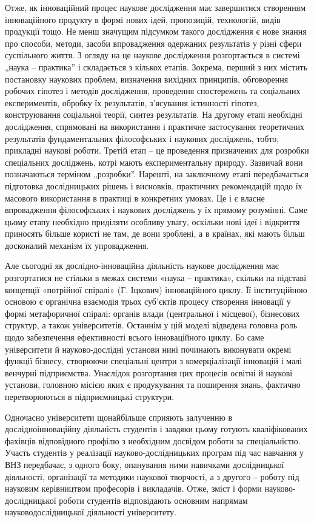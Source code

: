 Отже, як інноваційний процес наукове дослідження має завершитися
створенням інноваційного продукту в формі нових ідей, пропозицій,
технологій, видів продукції тощо. Не менш значущим підсумком такого
дослідження є нове знання про способи, методи, засоби впровадження
одержаних результатів у різні сфери суспільного життя. З огляду на це наукове
дослідження розгортається в системі „наука – практика” і складається з кількох
етапів. Зокрема, перший з них містить постановку наукових проблем,
визначення вихідних принципів, обговорення робочих гіпотез і методів
дослідження, проведення спостережень та соціальних експериментів, обробку
їх результатів, з’ясування істинності гіпотез, конструювання соціальної теорії,
синтез результатів. На другому етапі необхідні дослідження, спрямовані на
використання і практичне застосування теоретичних результатів
фундаментальних філософських і наукових досліджень, тобто, прикладні
наукові роботи. Третій етап – це проведення призначених для розробки
спеціальних досліджень, котрі мають експериментальну природу. Зазвичай вони
позначаються терміном „розробки”. Нарешті, на заключному етапі
передбачається підготовка дослідницьких рішень і висновків, практичних
рекомендацій щодо їх масового використання в практиці в конкретних умовах.
Це і є власне впровадження філософських і наукових досліджень у їх прямому
розумінні. Саме цьому етапу необхідно приділяти особливу увагу, оскільки нові
ідеї і відкриття приносять більше користі не там, де вони зроблені, а в країнах,
які мають більш досконалий механізм їх упровадження.

Але сьогодні як дослідно-інноваційна діяльність наукове дослідження має
розгортатися не стільки в межах системи «наука ‒ практика», скільки на
підставі концепції «потрійної спіралі» (Г. Іцкович) інноваційного циклу. Її
інституційною основою є органічна взаємодія трьох суб’єктів процесу
створення інновації у формі метафоричної спіралі: органів влади (центральної і
місцевої), бізнесових структур, а також університетів. Останнім у цій моделі
відведена головна роль щодо забезпечення ефективності всього інноваційного
циклу. Бо саме університети й науково-дослідні установи нині починають
виконувати окремі функції бізнесу, створюючи спеціальні центри з
комерціалізації інновацій і малі венчурні підприємства. Унаслідок розгортання
цих процесів освітні й наукові установи, головною місією яких є продукування
та поширення знань, фактично перетворюються в підприємницькі структури.

Одночасно університети щонайбільше сприяють залученню в дослідноінноваційну
діяльність студентів і завдяки цьому готують кваліфікованих
фахівців відповідного профілю з необхідним досвідом роботи за спеціальністю.
Участь студентів у реалізації науково-дос\-лід\-ниць\-ких програм під час навчання
у ВНЗ передбачає, з одного боку, опанування ними навичками дослідницької
діяльності, організації та методики наукової творчості, а з другого ‒ роботу під
науковим керівництвом професорів і викладачів. Отже, зміст і форми науково-
дослідницької роботи студентів відповідають основним напрямам науководослідницької діяльності університету.


